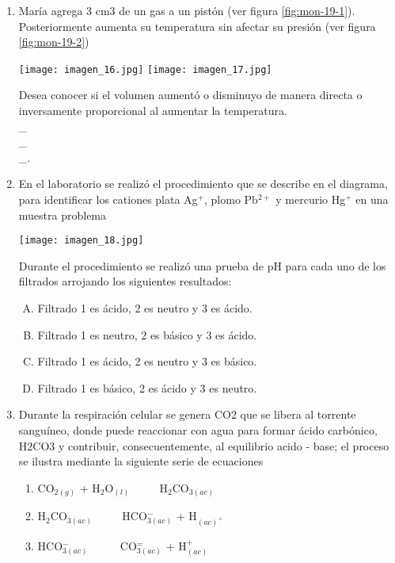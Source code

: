 \begin{enumerate}
\item María agrega 3 cm3 de un gas a un pistón (ver figura \ref{fig:mon-19-1}). Posteriormente aumenta su temperatura sin afectar su presión (ver figura \ref{fig:mon-19-2}) \label{mon-19}

\texttt{[image: imagen\_16.jpg]}
\label{fig:mon-19-1}
\texttt{[image: imagen\_17.jpg]}
\label{fig:mon-19-2}

Desea conocer si el volumen aumentó o disminuyo de manera directa o inversamente proporcional al aumentar la temperatura. \hrulefill\\
\_\hrulefill\\
\_\hrulefill\\
\_\hrulefill.

\item En el laboratorio se realizó el procedimiento que se describe en el diagrama, para identificar los cationes plata Ag$^+$, plomo Pb$^{2+}$ y mercurio Hg$^{+}$ en una muestra problema \label{mon-20}


\texttt{[image: imagen\_18.jpg]}

Durante el procedimiento se realizó una prueba de pH para cada uno de los filtrados arrojando los siguientes resultados:

\begin{enumerate}[(A)]
\item Filtrado 1 es ácido, 2 es neutro y 3 es ácido.
\item Filtrado 1 es neutro, 2 es básico y 3 es ácido. 
\item Filtrado 1 es ácido, 2 es neutro y 3 es básico.
\item Filtrado 1 es básico, 2 es ácido y 3 es neutro.
\end{enumerate}

\item Durante la respiración celular se genera CO2 que se libera al torrente sanguíneo, donde puede reaccionar con agua para formar ácido carbónico, H2CO3 y contribuir, consecuentemente, al equilibrio acido - base; el proceso se ilustra mediante la siguiente serie de ecuaciones \label{mon-21}

\begin{enumerate}[(1)]
\item CO$_{2 (g)}$ + H$_2$O$_{(l)}$ $\qquad $ H$_2$CO$_{3 (ac)}$
\item   H$_2$CO$_{3 (ac)}$     $\qquad $ HCO$_{3 (ac)}^-$ + H$_{(ac)^+}$
\item  HCO$_{3 (ac)}^-$       $\qquad\ $  CO$_{3(ac)}^=$ + H$^{+}_{(ac)}$
\end{enumerate}


\end{enumerate}
